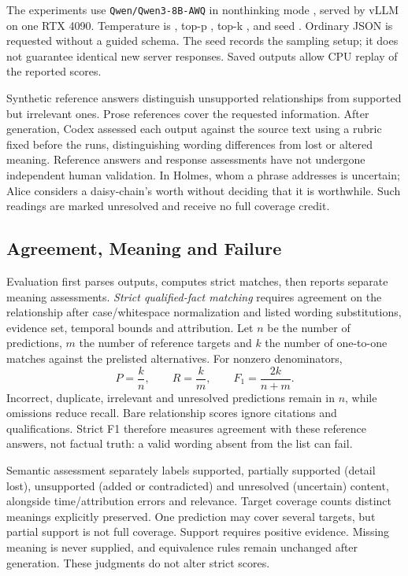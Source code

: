\documentclass[a4paper,twoside]{article}
\begin{document}
The experiments use \texttt{Qwen/Qwen3-8B-AWQ} in nonthinking mode \cite{qwen2025,qwenmodel}, served by vLLM \cite{kwon2023} on one RTX 4090. Temperature is \Temperature, top-p \TopP, top-k \TopK, and seed \Seed.  Ordinary JSON is requested without a guided schema. The seed records the sampling setup; it does not guarantee identical new server responses. Saved outputs allow CPU replay of the reported scores.

Synthetic reference answers distinguish unsupported relationships from supported but irrelevant ones. Prose references cover the requested information. After generation, Codex assessed each output against the source text using a rubric fixed before the runs, distinguishing wording differences from lost or altered meaning. Reference answers and response assessments have not undergone independent human validation. In Holmes, whom a phrase addresses is uncertain; Alice considers a daisy-chain's worth without deciding that it is worthwhile. Such readings are marked unresolved and receive no full coverage credit.




\subsection{Agreement, Meaning and Failure}
\noindent Evaluation first parses outputs, computes strict matches, then reports separate meaning assessments. \emph{Strict qualified-fact matching} requires agreement on the relationship after case/whitespace normalization and listed wording substitutions, evidence set, temporal bounds and attribution. Let $n$ be the number of predictions, $m$ the number of reference targets and $k$ the number of one-to-one matches against the prelisted alternatives. For nonzero denominators,
\begin{equation}
\label{eq:strict-scores}
P=\frac{k}{n}, \qquad
R=\frac{k}{m}, \qquad
F_1=\frac{2k}{n+m}.
\end{equation}
Incorrect, duplicate, irrelevant and unresolved predictions remain in $n$, while omissions reduce recall. Bare relationship scores ignore citations and qualifications. Strict F1 therefore measures agreement with these reference answers, not factual truth: a valid wording absent from the list can fail.

Semantic assessment separately labels supported, partially supported (detail lost), unsupported (added or contradicted) and unresolved (uncertain) content, alongside time/attribution errors and relevance. Target coverage counts distinct meanings explicitly preserved. One prediction may cover several targets, but partial support is not full coverage. Support requires positive evidence. Missing meaning is never supplied, and equivalence rules remain unchanged after generation. These judgments do not alter strict scores.
\end{document}
